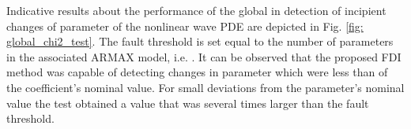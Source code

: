 \documentclass[journal]{IEEEtran}
\begin{document}
\begin{tabular}{c}
 \\

\end{tabular}
  \label{discrete_state_space_model1}
\begin{tabular}{c}

\end{tabular}
 \label{discrete_state_space_model2}
\begin{tabular}{c}

\end{tabular}
 \label{ARMA_model1}
\begin{tabular}{c}

\end{tabular}
 \label{discrete_state_space_model1_KF}
\begin{tabular}{c}
\\

\end{tabular}
 \label{discrete_state_space_model2_KF}
\begin{tabular}{c}

\end{tabular}
\label{ARMA_model_KF}
\begin{tabular}{c}
\\

\end{tabular}
\label{ARMA_model_KF_v2}
\begin{tabular}{c}

\end{tabular}
\label{weights_vector}
\begin{tabular}{l}
\\

\end{tabular}
 \label{regressor_vector}
\begin{tabular}{l}
\\

\end{tabular}


\noindent Indicative results about the performance of the global  in detection of incipient changes of parameter  of the nonlinear wave PDE are depicted in Fig. \ref{fig: global_chi2_test}. The fault threshold is set equal to the number of parameters in the associated ARMAX model, i.e. . It can be observed that the proposed FDI method was capable of detecting changes in parameter  which were less than  of the coefficient's nominal value. For small deviations from the parameter's nominal value the  test obtained a value that was several times larger than the fault threshold.
\end{document}
